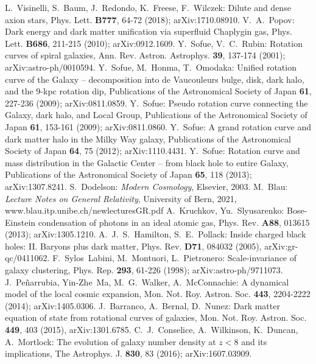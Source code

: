 \documentclass{article}
\begin{document}
\begin{thebibliography}{99}
L.~Visinelli, S.~Baum, J.~Redondo, K.~Freese, F.~Wilczek: Dilute and dense axion stars, Phys. Lett. \textbf{B777}, 64-72 (2018); arXiv:1710.08910.
V.~A.~Popov: Dark energy and dark matter unification via superfluid Chaplygin gas, Phys. Lett. \textbf{B686}, 211-215 (2010); arXiv:0912.1609.
Y.~Sofue, V.~C.~Rubin: Rotation curves of spiral galaxies, Ann. Rev. Astron. Astrophys. \textbf{39}, 137-174 (2001); arXiv:astro-ph/0010594.
Y.~Sofue, M.~Honma, T.~Omodaka: Unified rotation curve of the Galaxy -- decomposition into de Vaucouleurs bulge, disk, dark halo, and the 9-kpc rotation dip, Publications of the Astronomical Society of Japan \textbf{61}, 227-236 (2009); arXiv:0811.0859.
Y.~Sofue: Pseudo rotation curve connecting the Galaxy, dark halo, and Local Group, Publications of the Astronomical Society of Japan \textbf{61}, 153-161 (2009); arXiv:0811.0860.
Y.~Sofue: A grand rotation curve and dark matter halo in the Milky Way galaxy, Publications of the Astronomical Society of Japan \textbf{64}, 75 (2012); arXiv:1110.4431. 
Y.~Sofue: Rotation curve and mass distribution in the Galactic Center -- from black hole to entire Galaxy, Publications of the Astronomical Society of Japan \textbf{65}, 118 (2013); arXiv:1307.8241.
S.~Dodelson: \emph{Modern Cosmology}, Elsevier, 2003.
M.~Blau: \emph{Lecture Notes on General Relativity}, University of Bern, 2021, www.blau.itp.unibe.ch/newlecturesGR.pdf
A.~Kruchkov, Yu.~Slyusarenko: Bose-Einstein condensation of photons in an ideal atomic gas, Phys. Rev. \textbf{A88}, 013615 (2013); arXiv:1305.1210.
A.~J.~S.~Hamilton, S.~E.~Pollack: Inside charged black holes: II. Baryons plus dark matter, Phys. Rev. \textbf{D71}, 084032 (2005), arXiv:gr-qc/0411062.
F.~Sylos~Labini, M.~Montuori, L.~Pietronero: Scale-invariance of galaxy clustering, Phys. Rep. \textbf{293}, 61-226 (1998); arXiv:astro-ph/9711073.
J.~Peñarrubia, Yin-Zhe~Ma, M.~G.~Walker, A.~McConnachie: A dynamical model of the local cosmic expansion, Mon. Not. Roy. Astron. Soc. \textbf{443}, 2204-2222 (2014); arXiv:1405.0306.
J.~Barranco, A.~Bernal, D.~Nunez: Dark matter equation of state from rotational curves of galaxies, Mon. Not. Roy. Astron. Soc. \textbf{449}, 403 (2015), arXiv:1301.6785.
C.~J.~Conselice, A.~Wilkinson, K.~Duncan, A.~Mortlock: The evolution of galaxy number density at $z<8$ and its implications, The Astrophys. J. \textbf{830}, 83 (2016); arXiv:1607.03909.

\end{thebibliography}
\end{document}
